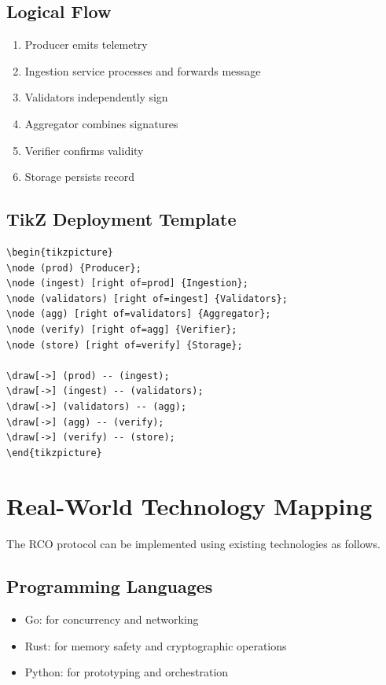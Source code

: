 \subsection{Logical Flow}

\begin{enumerate}
\item Producer emits telemetry
\item Ingestion service processes and forwards message
\item Validators independently sign
\item Aggregator combines signatures
\item Verifier confirms validity
\item Storage persists record
\end{enumerate}

\subsection{TikZ Deployment Template}

\begin{verbatim}
\begin{tikzpicture}
\node (prod) {Producer};
\node (ingest) [right of=prod] {Ingestion};
\node (validators) [right of=ingest] {Validators};
\node (agg) [right of=validators] {Aggregator};
\node (verify) [right of=agg] {Verifier};
\node (store) [right of=verify] {Storage};

\draw[->] (prod) -- (ingest);
\draw[->] (ingest) -- (validators);
\draw[->] (validators) -- (agg);
\draw[->] (agg) -- (verify);
\draw[->] (verify) -- (store);
\end{tikzpicture}
\end{verbatim}

\section{Real-World Technology Mapping}

The RCO protocol can be implemented using existing technologies as follows.

\subsection{Programming Languages}

\begin{itemize}
\item Go: for concurrency and networking
\item Rust: for memory safety and cryptographic operations
\item Python: for prototyping and orchestration
\end{itemize}

